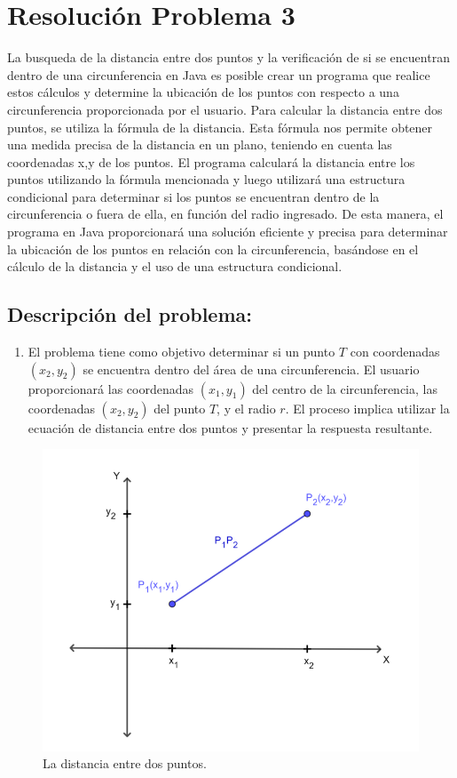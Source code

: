 \section{Resolución Problema 3}
La busqueda de la distancia entre dos puntos y la verificación de si se encuentran dentro de una circunferencia en Java es posible crear un programa que realice estos cálculos y determine la ubicación de los puntos con respecto a una circunferencia proporcionada por el usuario.
Para calcular la distancia entre dos puntos, se utiliza la fórmula de la distancia. Esta fórmula nos permite obtener una medida precisa de la distancia en un plano, teniendo en cuenta las coordenadas x,y de los puntos.
El programa calculará la distancia entre los puntos utilizando la fórmula mencionada y luego utilizará una estructura condicional para determinar si los puntos se encuentran dentro de la circunferencia o fuera de ella, en función del radio ingresado.
De esta manera, el programa en Java proporcionará una solución eficiente y precisa para determinar la ubicación de los puntos en relación con la circunferencia, basándose en el cálculo de la distancia y el uso de una estructura condicional.
\subsection{\textbf{Descripción del problema:}}
\begin{enumerate}
    \item El problema tiene como objetivo determinar si un punto $T$ con coordenadas $(x_{2}, y_{2})$ se encuentra dentro del área de una circunferencia. El usuario proporcionará las coordenadas $(x_{1}, y_{1})$ del centro de la circunferencia, las coordenadas $(x_{2}, y_{2})$ del punto $T$, y el radio $r$. El proceso implica utilizar la ecuación de distancia entre dos puntos y presentar la respuesta resultante.
\end{enumerate}
\begin{figure}[h!]
    \centering
    \includegraphics[width=1\linewidth]{LaTeX//latex-imagenes/Distancia_entre_dos_puntos-2-768x615.png}
    \caption{La distancia entre dos puntos.}
    \label{fig:enter-label}
\end{figure}
